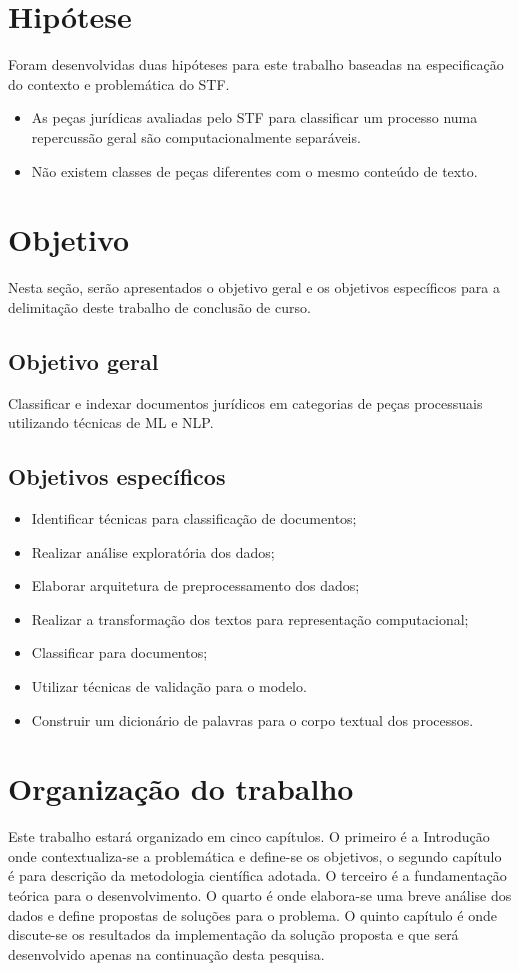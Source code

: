 \section{Hipótese}

Foram desenvolvidas duas hipóteses \cite{GIL2002} para este trabalho baseadas na especificação do contexto e problemática do STF. 

\begin{itemize}
	\item As peças jurídicas avaliadas pelo STF para classificar um processo numa repercussão geral são computacionalmente separáveis.
    \item Não existem classes de peças diferentes com o mesmo conteúdo de texto.
\end{itemize}

\section{Objetivo}
Nesta seção, serão apresentados o objetivo geral e os objetivos específicos para a delimitação deste trabalho de conclusão de curso.

\subsection{Objetivo geral}

Classificar e indexar documentos jurídicos em categorias de peças processuais utilizando técnicas de ML e NLP.

\subsection{Objetivos específicos}    

\begin{itemize}
  \item Identificar técnicas para classificação de documentos;
  \item Realizar análise exploratória dos dados;
  \item Elaborar arquitetura de preprocessamento dos dados;
  \item Realizar a transformação dos textos para representação computacional;
  \item Classificar para documentos;
  \item Utilizar técnicas de validação para o modelo.
  \item Construir um dicionário de palavras para o corpo textual dos processos.
\end{itemize}

\section{Organização do trabalho}
	Este trabalho estará organizado em cinco capítulos. O primeiro é a Introdução onde contextualiza-se a problemática e define-se os objetivos, o segundo capítulo é para descrição da metodologia científica adotada. O terceiro é a fundamentação teórica para o desenvolvimento. O quarto é onde elabora-se uma breve análise dos dados e define propostas de soluções para o problema. O quinto capítulo é onde discute-se os resultados da implementação da solução proposta e que será desenvolvido apenas na continuação desta pesquisa.